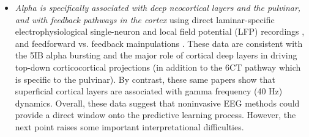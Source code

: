 \documentclass[11pt,twoside]{article}
\newif\myifpdf
\begin{document}
\begin{itemize}
	\item \emph{Alpha is specifically associated with deep neocortical layers and the pulvinar, and with feedback pathways in the cortex} using direct laminar-specific electrophysiological single-neuron and local field potential (LFP) recordings \citep{LuczakBarthoHarris13,BuffaloFriesLandmanEtAl11,MaierAdamsAuraEtAl10,MaierAuraLeopold11,SpaakBonnefondMaierEtAl12,XingYehBurnsEtAl12}, and feedforward vs. feedback mainpulations \citep{vonSteinChiangKonig00,vanKerkoerleSelfDagninoEtAl14,BastosVezoliBosmanEtAl15,JensenBonnefondMarshallEtAl15,MichalareasVezolivanPeltEtAl16}.  These data are consistent with the 5IB alpha bursting and the major role of cortical deep layers in driving top-down corticocortical projections (in addition to the 6CT pathway which is specific to the pulvinar).  By contrast, these same papers show that superficial cortical layers are associated with gamma frequency (40 Hz) dynamics.  Overall, these data suggest that noninvasive EEG methods could provide a direct window onto the predictive learning process.  However, the next point raises some important interpretational difficulties.
	

\end{itemize}
\end{document}
